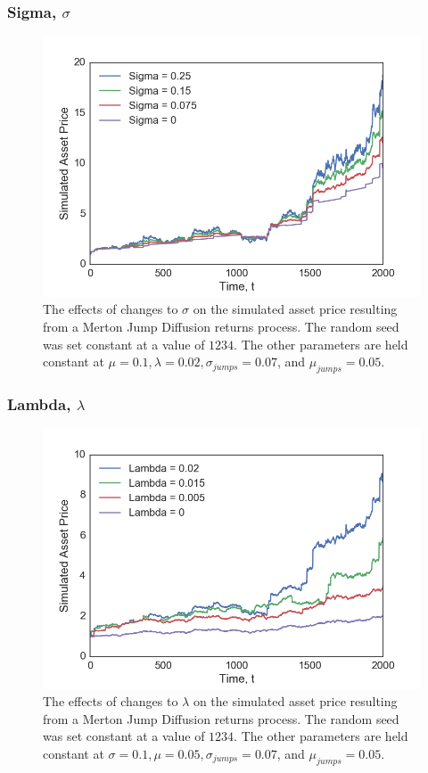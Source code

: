 \documentclass[11pt,oneside,openany,a4paper,english, report, goldenblock
]{usthesis}
\begin{document}
\subsubsection{Sigma, $\sigma$}

\begin{figure}[h]
	\centering
	\includegraphics[width=0.65\linewidth]{Images/Parameter-Effects/Effects_Sigma}
	\caption[The effects of changes to $\sigma$ on the Merton Jump Diffusion returns process]{The effects of changes to $\sigma$ on the simulated asset price resulting from a Merton Jump Diffusion returns process. The random seed was set constant at a value of $1234$. The other parameters are held constant at $\mu=0.1, \lambda=0.02, \sigma_{jumps}=0.07$, and $\mu_{jumps}=0.05$.}
	\label{fig:effects_sigma}
\end{figure}

\subsubsection{Lambda, $\lambda$}

\begin{figure}[h]
	\centering
	\includegraphics[width=0.7\linewidth]{Images/Parameter-Effects/Effects_Lambda}
	\caption[The effects of changes to $\lambda$ on the Merton Jump Diffusion returns process]{The effects of changes to $\lambda$ on the simulated asset price resulting from a Merton Jump Diffusion returns process. The random seed was set constant at a value of $1234$. The other parameters are held constant at $\sigma=0.1, \mu=0.05, \sigma_{jumps}=0.07$, and $\mu_{jumps}=0.05$.}
	\label{fig:effects_lambda}
\end{figure}
\end{document}
